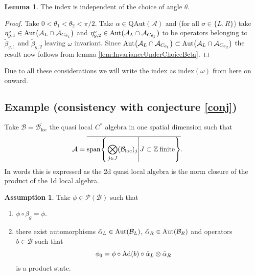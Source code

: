 \documentclass[12pt,a4paper,twoside]{article}
\let\originalleft\left
\let\originalright\right
\renewcommand{\left}{\mathopen{}\mathclose\bgroup\originalleft}
\renewcommand{\right}{\aftergroup\egroup\originalright}
\newcommand{\BB}{\mathcal B}
\newcommand{\PP}{\mathcal P}
\newcommand{\ZZ}{\mathbb Z}
\renewcommand{\AA}{\mathcal A}
\newcommand{\Ad}[1]{\textrm{Ad}\left(#1\right)}
\newcommand{\Aut}[1]{\textrm{Aut}\left(#1\right)}
\theoremstyle{definition}
\newtheorem{lemma}[theorem]{Lemma}
\newtheorem{assumption}[theorem]{Assumption}
\numberwithin{equation}{section}
\begin{document}
\begin{lemma}
	The index is independent of the choice of angle $\theta$.
\end{lemma}
\begin{proof}
	Take $0<\theta_1<\theta_2<\pi/2$. Take $\alpha\in \textrm{QAut}(\AA)$ and (for all $\sigma\in\{L,R\}$) take $\eta_{g,1}^\sigma\in\Aut{\AA_L\cap\AA_{C_{\theta_1}}}$ and $\eta_{g,2}^\sigma\in\Aut{\AA_L\cap\AA_{C_{\theta_2}}}$ to be operators belonging to $\tilde{\beta}_{g,1}$ and $\tilde{\beta}_{g,2}$ leaving $\omega$ invariant. Since $\Aut{\AA_L\cap\AA_{C_{\theta_1}}}\subset \Aut{\AA_L\cap\AA_{C_{\theta_2}}}$ the result now follows from lemma \ref{lem:InvarianceUnderChoiceBeta}.
\end{proof}
Due to all these considerations we will write the index as $\textrm{index}(\omega)$ from here on onward.
\subsection{Example (consistency with conjecture \ref{conj})}\label{sec:OneTranslationDirectionExample}
Take $\BB=\overline{\BB_{\text{loc}}}$ the quasi local $C^*$ algebra in one spatial dimension such that
\begin{equation}
	\AA=\overline{\textrm{span}\left\{\left.\bigotimes_{j\in J}(\BB_{\text{loc}})_j\right|J\subset \ZZ\:\text{finite}\right\}}.
\end{equation}
In words this is expressed as the 2d quasi local algebra is the norm closure of the product of the 1d local algebra.
\begin{assumption}\label{assumption1d}
	Take $\phi\in\PP(\BB)$ such that
	\begin{enumerate}
		\item $\phi\circ\beta_g=\phi$.
		\item there exist automorphisms $\tilde\alpha_L\in\Aut{\BB_L}$, $\tilde\alpha_R\in\Aut{\BB_R}$ and operators $b\in\BB$ such that
		\begin{equation}
			\phi_0=\phi\circ\Ad{b}\circ\tilde\alpha_L\otimes\tilde\alpha_R
		\end{equation}
		is a product state.
	\end{enumerate}
\end{assumption}
\end{document}
